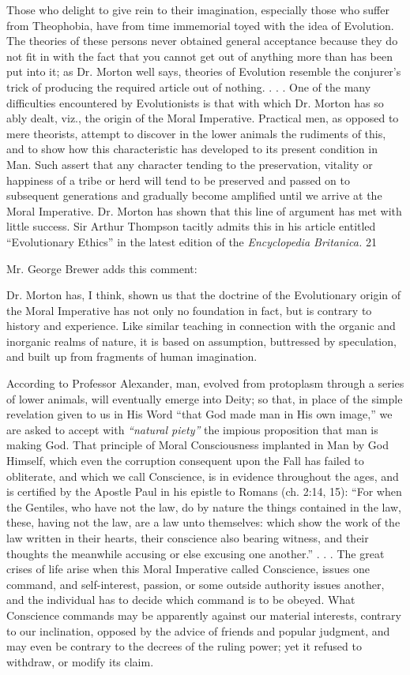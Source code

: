 Those who delight to give rein to their imagination, especially those who suffer from
Theophobia, have from time immemorial toyed with the idea of Evolution. The theories of
these persons never obtained general acceptance because they do not fit in with the fact that
you cannot get out of anything more than has been put into it; as Dr. Morton well says,
theories of Evolution resemble the conjurer's trick of producing the required article out of
nothing. . . . One of the many difficulties encountered by Evolutionists is that with which Dr.
Morton has so ably dealt, viz., the origin of the Moral Imperative. Practical men, as opposed
to mere theorists, attempt to discover in the lower animals the rudiments of this, and to show
how this characteristic has developed to its present condition in Man. Such assert that any
character tending to the preservation, vitality or happiness of a tribe or herd will tend to be
preserved and passed on to subsequent generations and gradually become amplified until we
arrive at the Moral Imperative. Dr. Morton has shown that this line of argument has met with
little success. Sir Arthur Thompson tacitly admits this in his article entitled ``Evolutionary
Ethics'' in the latest edition of the \textit{Encyclopedia Britanica.} 21

Mr. George Brewer adds this comment:

Dr. Morton has, I think, shown us that the doctrine of the Evolutionary origin of the Moral
Imperative has not only no foundation in fact, but is contrary to history and experience. Like
similar teaching in connection with the organic and inorganic realms of nature, it is based on
assumption, buttressed by speculation, and built up from fragments of human imagination.

According to Professor Alexander, man, evolved from protoplasm through a series of lower
animals, will eventually emerge into Deity; so that, in place of the simple revelation given to
us in His Word ``that God made man in His own image,'' we are asked to accept with \textit{``natural
piety''} the impious proposition that man is making God. That principle of Moral
Consciousness implanted in Man by God Himself, which even the corruption consequent
upon the Fall has failed to obliterate, and which we call Conscience, is in evidence
throughout the ages, and is certified by the Apostle Paul in his epistle to Romans (ch. 2:14,
15): ``For when the Gentiles, who have not the law, do by nature the things contained in the
law, these, having not the law, are a law unto themselves: which show the work of the law
written in their hearts, their conscience also bearing witness, and their thoughts the
meanwhile accusing or else excusing one another.'' . . . The great crises of life arise when this
Moral Imperative called Conscience, issues one command, and self-interest, passion, or some
outside authority issues another, and the individual has to decide which command is to be
obeyed. What Conscience commands may be apparently against our material interests,
contrary to our inclination, opposed by the advice of friends and popular judgment, and may
even be contrary to the decrees of the ruling power; yet it refused to withdraw, or modify its
claim.

